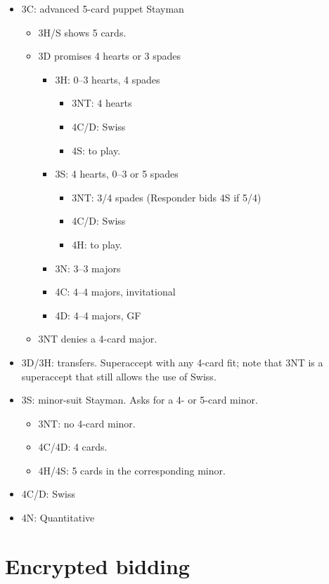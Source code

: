 \documentclass[a4paper,12pt]{article}
\begin{document}
\begin{itemize}
\item 3C: advanced 5-card puppet Stayman
	\begin{itemize}
   \item 3H/S shows 5 cards.
   \item 3D promises 4 hearts or 3 spades
		\begin{itemize}
      \item 3H: 0--3 hearts, 4 spades
			\begin{itemize}
         \item 3NT: 4 hearts
         \item 4C/D: Swiss
         \item 4S: to play.
			\end{itemize}
      \item 3S: 4 hearts, 0--3 or 5 spades
			\begin{itemize}
         \item 3NT: 3/4 spades (Responder bids 4S if 5/4)
         \item 4C/D: Swiss
         \item 4H: to play.
			\end{itemize}
      \item 3N: 3--3 majors
      \item 4C: 4--4 majors, invitational
      \item 4D: 4--4 majors, GF
		\end{itemize}
   \item 3NT denies a 4-card major.
	\end{itemize}

\item 3D/3H: transfers.  Superaccept with any 4-card fit; note that 3NT is a
superaccept that still allows the use of Swiss.

\item 3S: minor-suit Stayman.  Asks for a 4- or 5-card minor.
	\begin{itemize}
   \item 3NT: no 4-card minor.
   \item 4C/4D: 4 cards.
   \item 4H/4S: 5 cards in the corresponding minor.
	\end{itemize}

\item 4C/D: Swiss
\item 4N: Quantitative
\end{itemize}

\section{Encrypted bidding}
\end{document}
